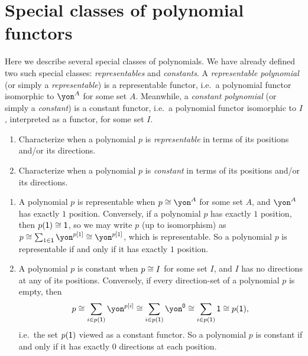 \documentclass[Book-Poly]{subfiles}
\begin{document}
\section{Special classes of polynomial functors} \label{sec.poly.obj.spec}

Here we describe several special classes of polynomials.
We have already defined two such special classes: \emph{representables} and \emph{constants}.
A \emph{representable polynomial} (or simply a \emph{representable}) is a representable functor, i.e.\ a polynomial functor isomorphic to $\yon^A$ for some set $A$.
Meanwhile, a \emph{constant polynomial} (or simply a \emph{constant}) is a constant functor, i.e.\ a polynomial functor isomorphic to $I$, interpreted as a functor, for some set $I$.


\begin{exercise}
\begin{enumerate}
  \item Characterize when a polynomial $p$ is \textit{representable} in terms of its positions and/or its directions.
  \item Characterize when a polynomial $p$ is \textit{constant} in terms of its positions and/or its directions. \qedhere
\end{enumerate}
\begin{solution}
\begin{enumerate}
  \item A polynomial $p$ is representable when $p\iso\yon^A$ for some set $A$, and $\yon^A$ has exactly $1$ position.
  Conversely, if a polynomial $p$ has exactly $1$ position, then $p(\textsf{1})\cong\textsf{1}$, so we may write $p$ (up to isomorphism) as $p\iso\sum_{1\in\1}\yon^{p[1]}\iso\yon^{p[1]}$, which is representable.
  So a polynomial $p$ is representable if and only if it has exactly $1$ position.

  \item A polynomial $p$ is constant when $p\cong I$ for some set $I$, and $I$ has no directions at any of its positions.
  Conversely, if every direction-set of a polynomial $p$ is empty, then
  \[
    p\iso\sum_{i\in p(\1)}\yon^{p[i]}\iso\sum_{i\in p(\1)}\yon^\0\iso\sum_{i\in p(\1)}\1\iso p(\1),
  \]
  i.e.\ the set $p(\textsf{1})$ viewed as a constant functor.
  So a polynomial $p$ is constant if and only if it has exactly $0$ directions at each position.
\end{enumerate}
\end{solution}
\end{exercise}
\end{document}
